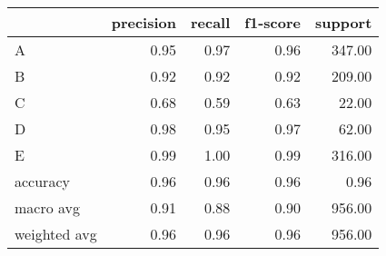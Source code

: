 \begin{tabular}{|l|r|r|r|r|}
\hline
{} &  precision &  recall &  f1-score &  support \\
\hline
A            &       0.95 &    0.97 &      0.96 &   347.00 \\
B            &       0.92 &    0.92 &      0.92 &   209.00 \\
C            &       0.68 &    0.59 &      0.63 &    22.00 \\
D            &       0.98 &    0.95 &      0.97 &    62.00 \\
E            &       0.99 &    1.00 &      0.99 &   316.00 \\
accuracy     &       0.96 &    0.96 &      0.96 &     0.96 \\
macro avg    &       0.91 &    0.88 &      0.90 &   956.00 \\
weighted avg &       0.96 &    0.96 &      0.96 &   956.00 \\
\hline
\end{tabular}
